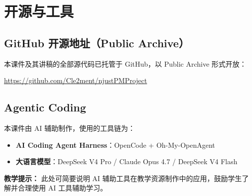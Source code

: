 \section{开源与工具}

\subsection{GitHub 开源地址（Public Archive）}

本课件及其讲稿的全部源代码已托管于 GitHub，以 Public Archive 形式开放：
\begin{center}
    \url{https://github.com/Cle2ment/njustPMProject}
\end{center}

\subsection{Agentic Coding}

本课件由 AI 辅助制作，使用的工具链为：
\begin{itemize}
    \item \textbf{AI Coding Agent Harness}：OpenCode + Oh-My-OpenAgent
    \item \textbf{大语言模型}：DeepSeek V4 Pro / Claude Opus 4.7 / DeepSeek V4 Flash
\end{itemize}

\textbf{教学提示：} 此处可简要说明 AI 辅助工具在教学资源制作中的应用，鼓励学生了解并合理使用 AI 工具辅助学习。
